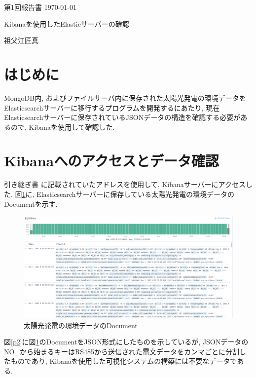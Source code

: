 \documentclass[a4j,12pt,]{jarticle}
\begin{document}
{\noindent\small 第1回報告書 \hfill\today}
\begin{center}
  {\Large Kibanaを使用したElasticサーバーの確認}
\end{center}
\begin{flushright}
  祖父江匠真 \\
\end{flushright}

\section{はじめに}
MongoDB内, およびファイルサーバ内に保存された太陽光発電の環境データをElasticsearchサーバーに移行するプログラムを開発するにあたり, 現在Elasticsearchサーバーに保存されているJSONデータの構造を確認する必要があるので, Kibanaを使用して確認した.

\section{Kibanaへのアクセスとデータ確認}
引き継ぎ書 \cite{1}に記載されていたアドレスを使用して, Kibanaサーバーにアクセスした.
図\ref{p1}に, Elasticsearchサーバーに保存している太陽光発電の環境データのDocumentを示す.

\begin{figure}[H]
  \begin{center}
    \includegraphics[width=160mm]{json.png}
    \caption{太陽光発電の環境データのDocument}
    \label{p1}
  \end{center}
\end{figure}

図\ref{p2}に図\ref{p1}のDocumentをJSON形式にしたものを示しているが, JSONデータのNO\_から始まるキーはRS485から送信された電文データをカンマごとに分割したものであり, Kibanaを使用した可視化システムの構築には不要なデータである.
\end{document}
